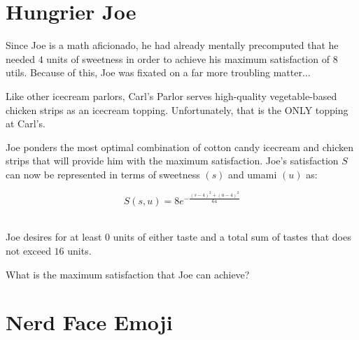 \setcounter{chapter}{2}
\chapter{Hungrier Joe}
Since Joe is a math aficionado, he had already mentally precomputed that he needed $4$ units of sweetness in order to achieve his maximum satisfaction of $8$ utils.
Because of this, Joe was fixated on a far more troubling matter...

Like other icecream parlors, Carl's Parlor serves high-quality vegetable-based chicken strips as an icecream topping.
Unfortunately, that is the ONLY topping at Carl's.

Joe ponders the most optimal combination of cotton candy icecream and chicken strips that will provide him with the maximum satisfaction.
Joe's satisfaction $S$ can now be represented in terms of sweetness $(s)$ and umami $(u)$ as:\par
\LARGE
\begin{equation}
	S(s, u) = 8e^{-\frac{(s-4)^2+(u-4)^2}{64}}
\end{equation}
\normalsize
\\
\begin{eg}
	Joe desires for at least $0$ units of either taste and a total sum of tastes that does not exceed $16$ units.
	
	What is the maximum satisfaction that Joe can achieve?
\end{eg}

\setcounter{chapter}{3}
\chapter{Nerd Face Emoji} %
